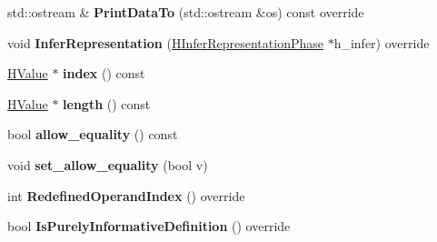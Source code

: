 \begin{DoxyCompactItemize}
\item 
std\+::ostream \& {\bfseries Print\+Data\+To} (std\+::ostream \&os) const  override\hypertarget{classv8_1_1internal_1_1_h_bounds_check_ad43f0b3724550d8769f1b2416f1b202d}{}\label{classv8_1_1internal_1_1_h_bounds_check_ad43f0b3724550d8769f1b2416f1b202d}

\item 
void {\bfseries Infer\+Representation} (\hyperlink{classv8_1_1internal_1_1_h_infer_representation_phase}{H\+Infer\+Representation\+Phase} $\ast$h\+\_\+infer) override\hypertarget{classv8_1_1internal_1_1_h_bounds_check_a1d850ae363b598029d90ac4e83025e9a}{}\label{classv8_1_1internal_1_1_h_bounds_check_a1d850ae363b598029d90ac4e83025e9a}

\item 
\hyperlink{classv8_1_1internal_1_1_h_value}{H\+Value} $\ast$ {\bfseries index} () const \hypertarget{classv8_1_1internal_1_1_h_bounds_check_ac551a39abfa49192b91019338c8c3b59}{}\label{classv8_1_1internal_1_1_h_bounds_check_ac551a39abfa49192b91019338c8c3b59}

\item 
\hyperlink{classv8_1_1internal_1_1_h_value}{H\+Value} $\ast$ {\bfseries length} () const \hypertarget{classv8_1_1internal_1_1_h_bounds_check_a7be8774cf3205fac104c54514ab84f00}{}\label{classv8_1_1internal_1_1_h_bounds_check_a7be8774cf3205fac104c54514ab84f00}

\item 
bool {\bfseries allow\+\_\+equality} () const \hypertarget{classv8_1_1internal_1_1_h_bounds_check_ad471541b39e3d5ea15c9518a4627e56b}{}\label{classv8_1_1internal_1_1_h_bounds_check_ad471541b39e3d5ea15c9518a4627e56b}

\item 
void {\bfseries set\+\_\+allow\+\_\+equality} (bool v)\hypertarget{classv8_1_1internal_1_1_h_bounds_check_ac049f63cdf25a243d8709aa2727184b4}{}\label{classv8_1_1internal_1_1_h_bounds_check_ac049f63cdf25a243d8709aa2727184b4}

\item 
int {\bfseries Redefined\+Operand\+Index} () override\hypertarget{classv8_1_1internal_1_1_h_bounds_check_a2458bbba19e474f26e920c7e068cbbf2}{}\label{classv8_1_1internal_1_1_h_bounds_check_a2458bbba19e474f26e920c7e068cbbf2}

\item 
bool {\bfseries Is\+Purely\+Informative\+Definition} () override\hypertarget{classv8_1_1internal_1_1_h_bounds_check_a32a1b897e6e77415708e37b4c1fef4a8}{}\label{classv8_1_1internal_1_1_h_bounds_check_a32a1b897e6e77415708e37b4c1fef4a8}

\end{DoxyCompactItemize}
